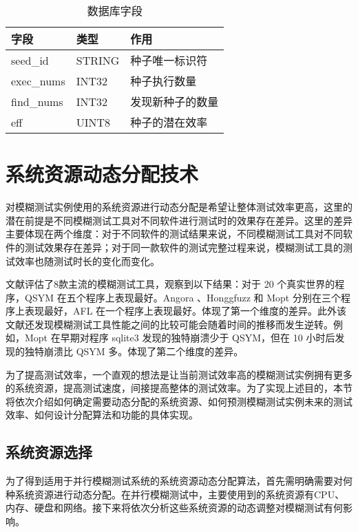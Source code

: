 \documentclass[master]{thesis-uestc}
\begin{document}
\begin{table}[!htbp]
    \caption{数据库字段}
    \begin{tabular}{lll}
    \toprule
    字段 & 类型 & 作用 \\
    \midrule
    seed\_id & STRING & 种子唯一标识符 \\
    exec\_nums & INT32 & 种子执行数量 \\
    find\_nums & INT32 & 发现新种子的数量 \\
    eff & UINT8 & 种子的潜在效率 \\
    \bottomrule
    \end{tabular}
    \label{table_database}
    \vspace{6pt}
\end{table}

\section{系统资源动态分配技术}

对模糊测试实例使用的系统资源进行动态分配是希望让整体测试效率更高，这里的潜在前提是不同模糊测试工具对不同软件进行测试时的效果存在差异。这里的差异主要体现在两个维度：对于不同软件的测试结果来说，不同模糊测试工具对不同软件的测试效果存在差异；对于同一款软件的测试完整过程来说，模糊测试工具的测试效率也随测试时长的变化而变化。

文献\cite{li2021unifuzz}评估了8款主流的模糊测试工具，观察到以下结果：对于 20 个真实世界的程序，QSYM 在五个程序上表现最好。Angora 、Honggfuzz 和 Mopt 分别在三个程序上表现最好，AFL 在一个程序上表现最好。体现了第一个维度的差异。此外该文献还发现模糊测试工具性能之间的比较可能会随着时间的推移而发生逆转。例如，Mopt 在早期对程序 sqlite3 发现的独特崩溃少于 QSYM，但在 10 小时后发现的独特崩溃比 QSYM 多。体现了第二个维度的差异。

为了提高测试效率，一个直观的想法是让当前测试效率高的模糊测试实例拥有更多的系统资源，提高测试速度，间接提高整体的测试效率。为了实现上述目的，本节将依次介绍如何确定需要动态分配的系统资源、如何预测模糊测试实例未来的测试效率、如何设计分配算法和功能的具体实现。

\subsection{系统资源选择}

为了得到适用于并行模糊测试系统的系统资源动态分配算法，首先需明确需要对何种系统资源进行动态分配。在并行模糊测试中，主要使用到的系统资源有CPU、内存、硬盘和网络。接下来将依次分析这些系统资源的动态调整对模糊测试有何影响。
\end{document}
